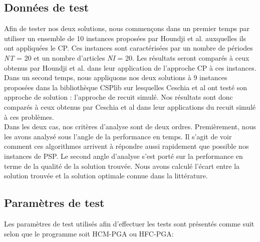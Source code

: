 \documentclass[12pt,a4paper]{article}
\begin{document}
		\subsection{Données de test}
		
		Afin de tester nos deux solutions, nous commençons dans un premier temps par utiliser un ensemble de 10 instances proposées par Houndji et al. auxquelles ils ont appliquées le CP. Ces instances sont caractérisées par un nombre de périodes \emph{NT} = 20 et un nombre d'articles \emph{NI} = 20. Les résultats seront comparés à ceux obtenus par Houndji et al. dans leur application de l'approche CP à ces instances. \\
		\hspace*{.5cm} Dans un second temps, nous appliquons nos deux solutions à 9 instances proposées dans la bibliothèque CSPlib sur lesquelles Ceschia et al ont testé son approche de solution : l'approche de recuit simulé. Nos résultats sont donc comparés à ceux obtenus par Ceschia et al dans leur applications du recuit simulé à ces problèmes. \\
		\hspace*{.5cm} Dans les deux cas, nos critères d'analyse sont de deux ordres. Premièrement, nous les avons analysé sous l'angle de la performance en temps. Il s'agit de voir comment ces algorithmes arrivent à répondre aussi rapidement que possible nos instances de PSP.  Le second angle d'analyse s'est porté sur la performance en terme de la qualité de la solution trouvée. Nous avons calculé l'écart entre la solution trouvée et la solution optimale connue dans la littérature.
		
		\subsection{Paramètres de test}
		Les paramètres de test utilisés afin d'effectuer les tests sont présentés comme suit selon que le programme soit HCM-PGA ou HFC-PGA:
\end{document}
